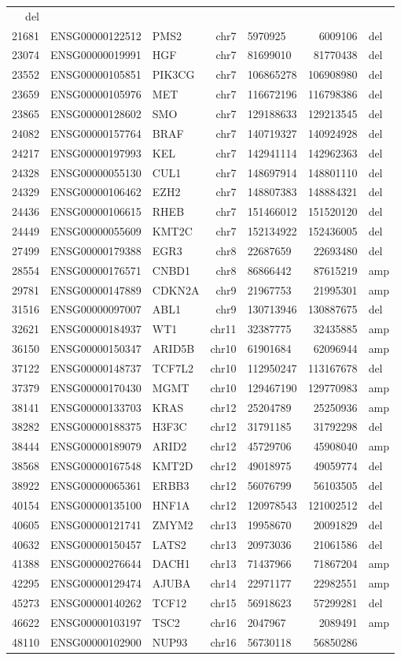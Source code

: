 \documentclass[]{article}
\begin{document}
\begin{longtable}[]{@{}rrlrlrl@{}}
del\tabularnewline
21681 & ENSG00000122512 & PMS2 & chr7 & 5970925 & 6009106 &
del\tabularnewline
23074 & ENSG00000019991 & HGF & chr7 & 81699010 & 81770438 &
del\tabularnewline
23552 & ENSG00000105851 & PIK3CG & chr7 & 106865278 & 106908980 &
del\tabularnewline
23659 & ENSG00000105976 & MET & chr7 & 116672196 & 116798386 &
del\tabularnewline
23865 & ENSG00000128602 & SMO & chr7 & 129188633 & 129213545 &
del\tabularnewline
24082 & ENSG00000157764 & BRAF & chr7 & 140719327 & 140924928 &
del\tabularnewline
24217 & ENSG00000197993 & KEL & chr7 & 142941114 & 142962363 &
del\tabularnewline
24328 & ENSG00000055130 & CUL1 & chr7 & 148697914 & 148801110 &
del\tabularnewline
24329 & ENSG00000106462 & EZH2 & chr7 & 148807383 & 148884321 &
del\tabularnewline
24436 & ENSG00000106615 & RHEB & chr7 & 151466012 & 151520120 &
del\tabularnewline
24449 & ENSG00000055609 & KMT2C & chr7 & 152134922 & 152436005 &
del\tabularnewline
27499 & ENSG00000179388 & EGR3 & chr8 & 22687659 & 22693480 &
del\tabularnewline
28554 & ENSG00000176571 & CNBD1 & chr8 & 86866442 & 87615219 &
amp\tabularnewline
29781 & ENSG00000147889 & CDKN2A & chr9 & 21967753 & 21995301 &
amp\tabularnewline
31516 & ENSG00000097007 & ABL1 & chr9 & 130713946 & 130887675 &
del\tabularnewline
32621 & ENSG00000184937 & WT1 & chr11 & 32387775 & 32435885 &
amp\tabularnewline
36150 & ENSG00000150347 & ARID5B & chr10 & 61901684 & 62096944 &
amp\tabularnewline
37122 & ENSG00000148737 & TCF7L2 & chr10 & 112950247 & 113167678 &
del\tabularnewline
37379 & ENSG00000170430 & MGMT & chr10 & 129467190 & 129770983 &
amp\tabularnewline
38141 & ENSG00000133703 & KRAS & chr12 & 25204789 & 25250936 &
amp\tabularnewline
38282 & ENSG00000188375 & H3F3C & chr12 & 31791185 & 31792298 &
del\tabularnewline
38444 & ENSG00000189079 & ARID2 & chr12 & 45729706 & 45908040 &
amp\tabularnewline
38568 & ENSG00000167548 & KMT2D & chr12 & 49018975 & 49059774 &
del\tabularnewline
38922 & ENSG00000065361 & ERBB3 & chr12 & 56076799 & 56103505 &
del\tabularnewline
40154 & ENSG00000135100 & HNF1A & chr12 & 120978543 & 121002512 &
del\tabularnewline
40605 & ENSG00000121741 & ZMYM2 & chr13 & 19958670 & 20091829 &
del\tabularnewline
40632 & ENSG00000150457 & LATS2 & chr13 & 20973036 & 21061586 &
del\tabularnewline
41388 & ENSG00000276644 & DACH1 & chr13 & 71437966 & 71867204 &
amp\tabularnewline
42295 & ENSG00000129474 & AJUBA & chr14 & 22971177 & 22982551 &
amp\tabularnewline
45273 & ENSG00000140262 & TCF12 & chr15 & 56918623 & 57299281 &
del\tabularnewline
46622 & ENSG00000103197 & TSC2 & chr16 & 2047967 & 2089491 &
amp\tabularnewline
48110 & ENSG00000102900 & NUP93 & chr16 & 56730118 & 56850286 &

\end{longtable}
\end{document}
